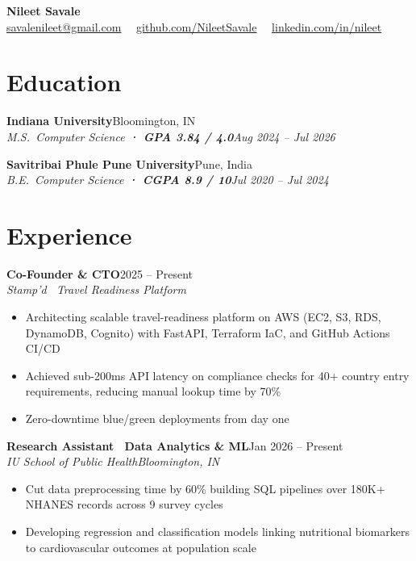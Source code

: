 \documentclass[10pt,letterpaper]{article}
\newcommand{\expentry}[4]{%
  \vspace{1pt}\noindent
  \textbf{#1}\hfill{\small #2}\\[-3pt]
  \textit{\small #3}\hfill{\textit{\small #4}}%
  \vspace{-4pt}
}
\newenvironment{bullets}{%
  \begin{itemize}[leftmargin=1.3em, itemsep=0pt, topsep=3pt, parsep=0pt, partopsep=0pt]\small
}{%
  \end{itemize}\vspace{1pt}
}
\begin{document}
\begin{center}
  {\LARGE\bfseries Nileet Savale}\\[3pt]
  \small
  \href{mailto:savalenileet@gmail.com}{savalenileet@gmail.com}
  \ \textbar\
  \href{https://github.com/NileetSavale}{github.com/NileetSavale}
  \ \textbar\
  \href{https://linkedin.com/in/nileet}{linkedin.com/in/nileet}
\end{center}

\section{Education}

\expentry{Indiana University}{Bloomington, IN}%
  {M.S.\ Computer Science \textbf{· GPA 3.84 / 4.0}}{Aug 2024 -- Jul 2026}

\vspace{3pt}
\expentry{Savitribai Phule Pune University}{Pune, India}%
  {B.E.\ Computer Science \textbf{· CGPA 8.9 / 10}}{Jul 2020 -- Jul 2024}

\section{Experience}

\expentry{Co-Founder \& CTO}{2025 -- Present}{Stamp'd \textemdash\ Travel Readiness Platform}{}
\begin{bullets}
  \item Architecting scalable travel-readiness platform on AWS (EC2, S3, RDS, DynamoDB, Cognito) with FastAPI, Terraform IaC, and GitHub Actions CI/CD
  \item Achieved sub-200ms API latency on compliance checks for 40+ country entry requirements, reducing manual lookup time by 70\%
  \item Zero-downtime blue/green deployments from day one
\end{bullets}

\expentry{Research Assistant \textemdash\ Data Analytics \& ML}{Jan 2026 -- Present}%
  {IU School of Public Health}{Bloomington, IN}
\begin{bullets}
  \item Cut data preprocessing time by 60\% building SQL pipelines over 180K+ NHANES records across 9 survey cycles
  \item Developing regression and classification models linking nutritional biomarkers to cardiovascular outcomes at population scale
\end{bullets}
\end{document}
